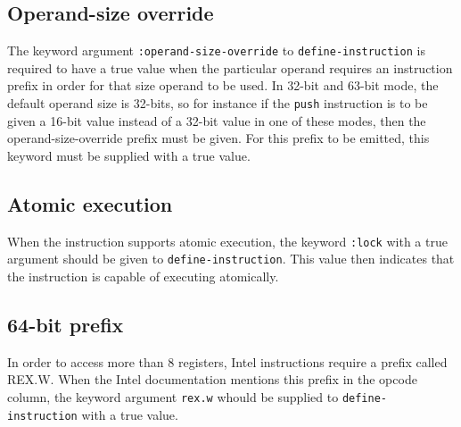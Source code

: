 \subsection{Operand-size override}

The keyword argument \texttt{:operand-size-override} to
\texttt{define-instruction} is required to have a true value when the
particular operand requires an instruction prefix in order for that
size operand to be used.  In 32-bit and 63-bit mode, the default
operand size is 32-bits, so for instance if the \texttt{push}
instruction is to be given a 16-bit value instead of a 32-bit value in
one of these modes, then the operand-size-override prefix must be
given.  For this prefix to be emitted, this keyword must be supplied
with a true value.

\subsection{Atomic execution}

When the instruction supports atomic execution, the keyword
\texttt{:lock} with a true argument should be given to
\texttt{define-instruction}.  This value then indicates that the
instruction is capable of executing atomically.

\subsection{64-bit prefix}

In order to access more than 8 registers, Intel instructions require a
prefix called REX.W.  When the Intel documentation mentions this
prefix in the opcode column, the keyword argument \texttt{rex.w}
whould be supplied to \texttt{define-instruction} with a true value.
